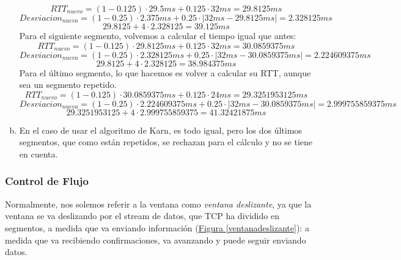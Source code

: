 \documentclass[10pt,a4paper,spanish]{report}
\begin{document}
\begin{enumerate}[a)]
    \begin{displaymath}
        RTT_{nuevo}=(1- 0.125) \cdot 29.5ms + 0.125 \cdot 32ms = 29.8125ms
    \end{displaymath}
    \begin{displaymath}
        Desviacion_{nueva} = (1-0.25) \cdot 2.375ms + 0.25\cdot|32ms - 29.8125ms| = 2.328125ms
    \end{displaymath}
    \begin{displaymath}
        29.8125+4\cdot2.328125 = 39.125ms
    \end{displaymath}
    Para el siguiente segmento, volvemos a calcular el tiempo igual que antes:
    \begin{displaymath}
        RTT_{nuevo}=(1- 0.125) \cdot 29.8125ms + 0.125 \cdot 32ms = 30.0859375ms
    \end{displaymath}
    \begin{displaymath}
        Desviacion_{nueva} = (1-0.25) \cdot 2.328125ms + 0.25\cdot|32ms - 30.0859375ms| = 2.224609375ms
    \end{displaymath}
    \begin{displaymath}
        29.8125+4\cdot2.328125 = 38.984375ms
    \end{displaymath}
    Para el último segmento, lo que hacemos es volver a calcular su RTT, aunque sea un segmento repetido.
    \begin{displaymath}
        RTT_{nuevo}=(1- 0.125) \cdot 30.0859375ms + 0.125 \cdot 24ms = 29.3251953125ms
    \end{displaymath}
    \begin{displaymath}
        Desviacion_{nueva} = (1-0.25) \cdot 2.224609375ms + 0.25\cdot|32ms - 30.0859375ms| = 2.999755859375ms
    \end{displaymath}
    \begin{displaymath}
        29.3251953125+4\cdot2.999755859375 = 41.32421875ms
    \end{displaymath}

    \item En el caso de usar el algoritmo de Karn, es todo igual, pero los dos últimos segmentos, que como están repetidos, se rechazan para el cálculo y no se tiene en cuenta.
\end{enumerate}


\subsubsection{\textcolor{tema3}Control de Flujo}
Normalmente, nos solemos referir a la ventana como \textit{\textcolor{tema3}{ventana deslizante}}, ya que la ventana se va deslizando por el stream de datos, que TCP ha dividido en segmentos, a medida que va enviando información (\hyperref[ventanadeslizante]{Figura \ref*{ventanadeslizante}}): a medida que va recibiendo confirmaciones, va avanzando y puede seguir enviando datos.
\end{document}
